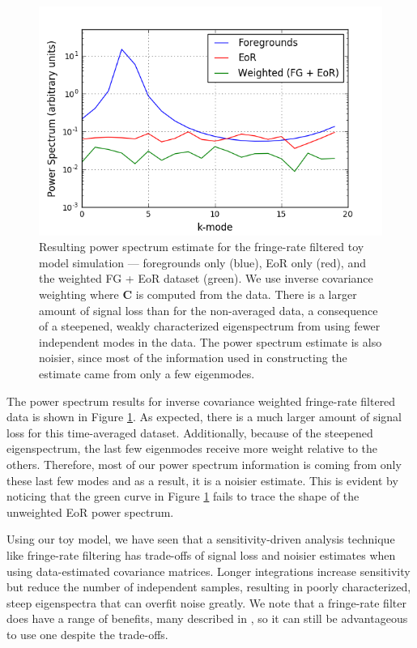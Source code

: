\documentclass[preprint2,numberedappendix,tighten]{aastex6}  %
\begin{document}
\begin{figure}
	\centering
	\includegraphics[trim={0.3cm 0.2cm 0.3cm 0.3cm},clip,width=\columnwidth]{plots/toy_sigloss7.png}
	\caption{Resulting power spectrum estimate for the fringe-rate filtered toy model simulation --- foregrounds only (blue), EoR only (red), and the weighted FG + EoR dataset (green). We use inverse covariance weighting where $\textbf{C}$ is computed from the data. There is a larger amount of signal loss than for the non-averaged data, a consequence of a steepened, weakly characterized eigenspectrum from using fewer independent modes in the data. The power spectrum estimate is also noisier, since most of the information used in constructing the estimate came from only a few eigenmodes.}
	\label{fig:toy_sigloss7}
\end{figure}

The power spectrum results for inverse covariance weighted fringe-rate filtered data is shown in Figure \ref{fig:toy_sigloss7}. As expected, there is a much larger amount of signal loss for this time-averaged dataset. Additionally, because of the steepened eigenspectrum, the last few eigenmodes receive more weight relative to the others. Therefore, most of our power spectrum information is coming from only these last few modes and as a result, it is a noisier estimate. This is evident by noticing that the green curve in Figure \ref{fig:toy_sigloss7} fails to trace the shape of the unweighted EoR power spectrum.

Using our toy model, we have seen that a sensitivity-driven analysis technique like fringe-rate filtering has trade-offs of signal loss and noisier estimates when using data-estimated covariance matrices. Longer integrations increase sensitivity but reduce the number of independent samples, resulting in poorly characterized, steep eigenspectra that can overfit noise greatly. We note that a fringe-rate filter does have a range of benefits, many described in \citet{parsons_et_al2016}, so it can still be advantageous to use one despite the trade-offs.
\end{document}
